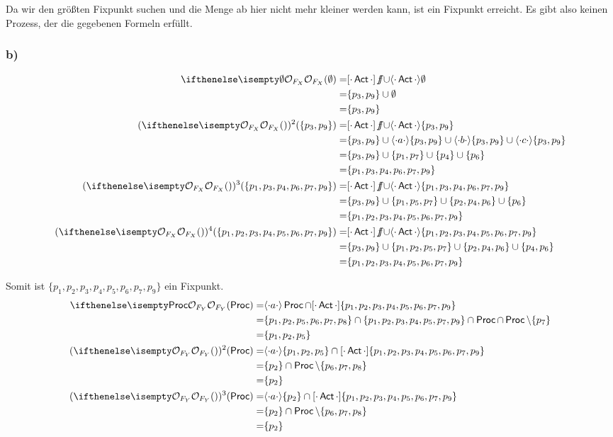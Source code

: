 Da wir den größten Fixpunkt suchen und die Menge ab hier nicht mehr kleiner werden kann, ist ein Fixpunkt erreicht.
Es gibt also keinen Prozess, der die gegebenen Formeln erfüllt.
\subsubsection*{b)}

\begin{align*}
\OSem{F_X}{\emptyset} =& \necessDenot{\Act}\false \cup \possDenot{\Act}\emptyset \\
				  =& \{p_3,p_9\} \cup \emptyset \\
				  =& \{p_3,p_9\} \\
(\OSem{F_X}{})^2(\{p_3,p_9\}) =& \necessDenot{\Act}\false \cup \possDenot{\Act}\{p_3,p_9\} \\
				  =& \{p_3,p_9\} \cup \possDenot{a}\{p_3,p_9\} \cup \possDenot{b}\{p_3,p_9\} \cup \possDenot{c}\{p_3,p_9\}\\
				  =& \{p_3,p_9\} \cup \{p_1,p_7\} \cup \{p_4\} \cup \{p_6\} \\
				  =& \{p_1,p_3,p_4,p_6,p_7,p_9\} \\
(\OSem{F_X}{})^3(\{p_1,p_3,p_4,p_6,p_7,p_9\}) =& \necessDenot{\Act}\false \cup \possDenot{\Act}\{p_1,p_3,p_4,p_6,p_7,p_9\} \\
				  =& \{p_3,p_9\} \cup \{p_1,p_5,p_7\} \cup \{p_2,p_4,p_6\} \cup \{p_6\}\\
  				  =& \{p_1,p_2,p_3,p_4,p_5,p_6,p_7,p_9\} \\
(\OSem{F_X}{})^4(\{p_1,p_2,p_3,p_4,p_5,p_6,p_7,p_9\}) =& \necessDenot{\Act}\false \cup \possDenot{\Act}\{p_1,p_2,p_3,p_4,p_5,p_6,p_7,p_9\} \\
				  =& \{p_3,p_9\} \cup \{p_1,p_2,p_5,p_7\} \cup \{p_2,p_4,p_6\} \cup \{p_4,p_6\} \\
  				  =& \{p_1,p_2,p_3,p_4,p_5,p_6,p_7,p_9\} \\
\end{align*}

Somit ist $\{p_1,p_2,p_3,p_4,p_5,p_6,p_7,p_9\}$ ein Fixpunkt. \\

\begin{align*}
\OSem{F_Y}{\Proc} =& \possDenot{a}\Proc \cap \necessDenot{\Act}\{p_1,p_2,p_3,p_4,p_5,p_6,p_7,p_9\} \\
				  =& \{p_1,p_2,p_5,p_6,p_7,p_8\} \cap \{p_1,p_2,p_3,p_4,p_5,p_7,p_9\} \cap \Proc \cap \Proc\setminus\{p_7\}\\
				  =& \{p_1,p_2,p_5\} \\
(\OSem{F_Y}{})^2(\Proc) =& \possDenot{a}\{p_1,p_2,p_5\} \cap \necessDenot{\Act}\{p_1,p_2,p_3,p_4,p_5,p_6,p_7,p_9\} \\
				  =& \{p_2\} \cap \Proc\setminus\{p_6,p_7,p_8\}\\
				  =& \{p_2\} \\
(\OSem{F_Y}{})^3(\Proc) =& \possDenot{a}\{p_2\} \cap \necessDenot{\Act}\{p_1,p_2,p_3,p_4,p_5,p_6,p_7,p_9\} \\
				  =& \{p_2\} \cap \Proc\setminus\{p_6,p_7,p_8\}\\
				  =& \{p_2\} \\
\end{align*}
